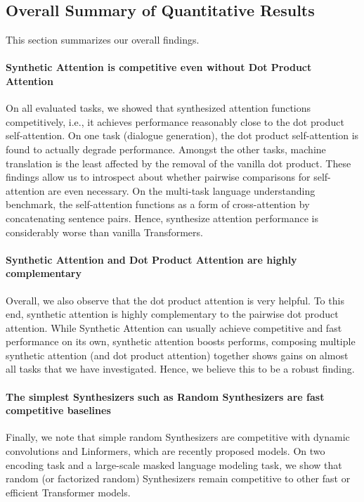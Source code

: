 \subsection{Overall Summary of Quantitative Results} This section summarizes our overall findings.
\paragraph{Synthetic Attention is competitive even without Dot Product Attention} On all evaluated tasks, we showed that synthesized attention functions competitively, i.e., it achieves performance reasonably close to the dot product self-attention. On one task (dialogue generation), the dot product self-attention is found to actually degrade performance. Amongst the other tasks, machine translation is the least affected by the removal of the vanilla dot product. These findings allow us to introspect about whether pairwise comparisons for self-attention are even necessary. On the multi-task language understanding benchmark, the self-attention functions as a form of cross-attention by concatenating sentence pairs. Hence, synthesize attention performance is considerably worse than vanilla Transformers. 
    \paragraph{Synthetic Attention and Dot Product Attention are highly complementary} Overall, we also observe that the dot product attention is very helpful. To this end, synthetic attention is highly complementary to the pairwise dot product attention. While Synthetic Attention can usually achieve competitive and fast performance on its own,  synthetic attention boosts performs, composing multiple synthetic attention (and dot product attention) together shows gains on almost all tasks that we have investigated. Hence, we believe this to be a robust finding. 

\paragraph{The simplest Synthesizers such as Random Synthesizers are fast competitive baselines} Finally, we note that simple random Synthesizers are competitive with dynamic convolutions and Linformers, which are recently proposed models. On two encoding task and a large-scale masked language modeling task, we show that random (or factorized random) Synthesizers remain competitive to other fast or efficient Transformer models.

